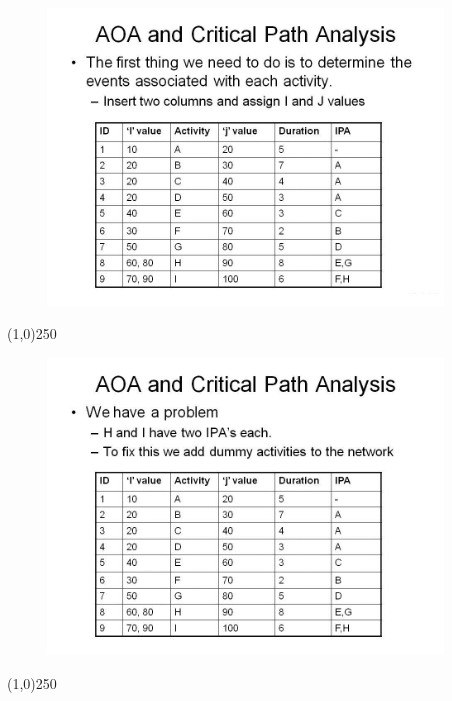 \begin{frame}
\begin{figure}
	\centering
		\includegraphics[width = 10.5cm]{oldnotes/Slide77.jpg}
\end{figure}
\end{frame}
\begin{center}\line(1,0){250}\end{center}


\begin{frame}
\begin{figure}
	\centering
		\includegraphics[width = 10.5cm]{oldnotes/Slide78.jpg}
\end{figure}
\end{frame}
\begin{center}\line(1,0){250}\end{center}



